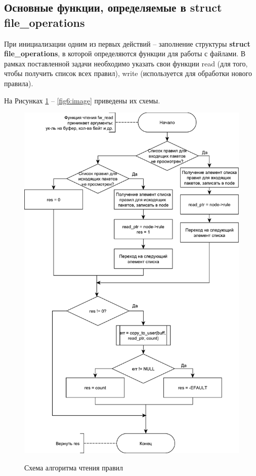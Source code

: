 \subsection{Основные функции, определяемые в struct file\_operations}
При инициализации одним из первых действий -- заполнение структуры \textbf{struct file\_operations}, в которой определяются функции для работы с файлами. В рамках поставленной задачи необходимо указать свои функции read (для того, чтобы получить список всех правил), write (используется для обработки нового правила). 

На Рисунках \ref{fig5:image} -- \ref{fig6:image} приведены их схемы.
\begin{figure}[h!]
	\begin{center}
		{\includegraphics[scale = 0.63]{img/read.pdf}}
		\caption{Схема алгоритма чтения правил}
		\label{fig5:image}
	\end{center}
\end{figure}

